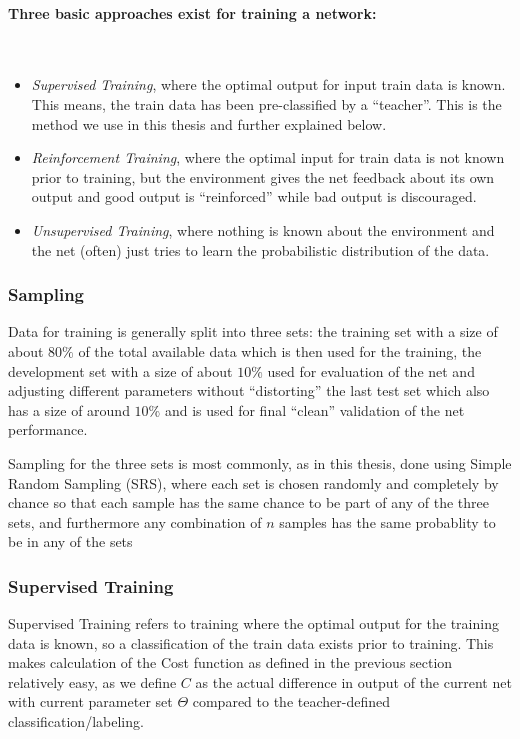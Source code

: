 \paragraph{Three basic approaches exist for training a network:} \hspace{0pt} \\
\begin{itemize}
\item \textit{Supervised Training}, where the optimal output for input train data is known. This means, the train data has been pre-classified by a ``teacher''. This is the method we use in this thesis and further explained below.
\item \textit{Reinforcement Training}, where the optimal input for train data is not known prior to training, but the environment gives the net feedback about its own output and good output is ``reinforced'' while bad output is discouraged.
\item \textit{Unsupervised Training}, where nothing is known about the environment and the net (often) just tries to learn the probabilistic distribution of the data.
\end{itemize}

\subsubsection{Sampling}
\label{sec:fund:Sampling}

Data for training is generally split into three sets: the training set with a size of about \(80\%\) of the total available data which is then used for the training, the development set with a size of about \(10\%\) used for evaluation of the net and adjusting different parameters without ``distorting'' the last test set which also has a size of around \(10\%\) and is used for final ``clean'' validation of the net performance.


Sampling for the three sets is most commonly, as in this thesis, done using Simple Random Sampling (SRS), where each set is chosen randomly and completely by chance so that each sample has the same chance to be part of any of the three sets, and furthermore any combination of \(n\) samples has the same probablity to be in any of the sets~\cite{meng2013scalable}

\subsubsection{Supervised Training}
\label{sec:fund:ST}
Supervised Training refers to training where the optimal output for the training data is known, so a classification of the train data exists prior to training. This makes calculation of the Cost function as defined in the previous section relatively easy, as we define \(C\) as the actual difference in output of the current net with current parameter set \(\Theta\) compared to the teacher-defined classification/labeling. 

